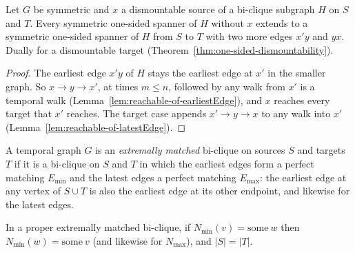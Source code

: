 \begin{theorem}
  \label{thm:source-dismountability}
  \leanok
  Let $G$ be symmetric and $x$ a dismountable source of a bi-clique subgraph
  $H$ on $S$ and $T$. Every symmetric one-sided spanner of $H$ without $x$
  extends to a symmetric one-sided spanner of $H$ from $S$ to $T$ with two more
  edges $x'y$ and $yx$. Dually for a dismountable target
  (Theorem~\ref{thm:one-sided-dismountability}).
\end{theorem}

\begin{proof}
  \leanok
  The earliest edge $x'y$ of $H$ stays the earliest edge at $x'$ in the smaller
  graph. So $x \to y \to x'$, at times $m \le n$, followed by any walk from $x'$
  is a temporal walk (Lemma~\ref{lem:reachable-of-earliestEdge}), and $x$
  reaches every target that $x'$ reaches. The target case appends
  $x' \to y \to x$ to any walk into $x'$ (Lemma~\ref{lem:reachable-of-latestEdge}).
\end{proof}

\begin{definition}
  \label{def:extremally-matched}
  \leanok
  A temporal graph $G$ is an \emph{extremally matched} bi-clique on sources $S$
  and targets $T$ if it is a bi-clique on $S$ and $T$ in which the earliest
  edges form a perfect matching $E_{\min}$ and the latest edges a perfect
  matching $E_{\max}$: the earliest edge at any vertex of $S \cup T$ is also the
  earliest edge at its other endpoint, and likewise for the latest edges.
\end{definition}

\begin{lemma}
  \label{lem:extremally-matched-basic}
  \leanok
  In a proper extremally matched bi-clique, if $N_{\min}(v) = \mathrm{some}\ w$
  then $N_{\min}(w) = \mathrm{some}\ v$ (and likewise for $N_{\max}$), and
  $|S| = |T|$.
\end{lemma}

